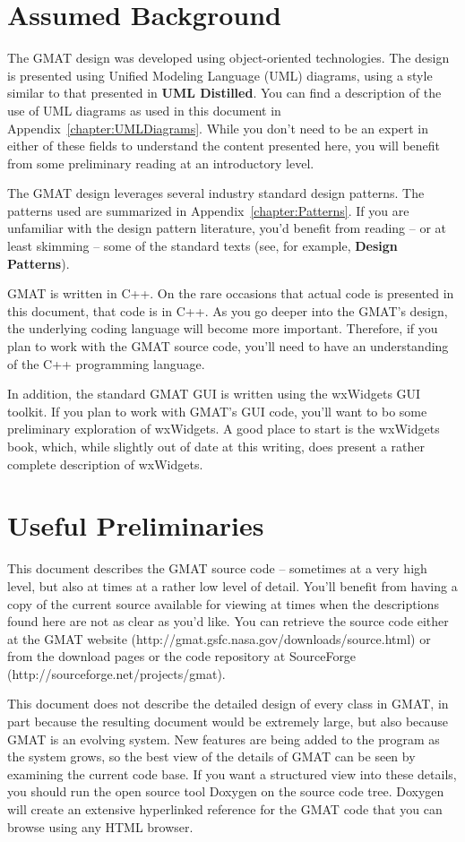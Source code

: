\section*{Assumed Background}

The GMAT design was developed using object-oriented technologies.  The design is presented using
Unified Modeling Language (UML) diagrams, using a style similar to that presented in \textbf{UML
Distilled}\cite{fowler}.  You can find a description of the use of UML diagrams as used in this
document in Appendix~\ref{chapter:UMLDiagrams}.  While you don't need to be an expert in either of
these fields to understand the content presented here, you will benefit from some preliminary
reading at an introductory level.

The GMAT design leverages several industry standard design patterns.  The patterns used are
summarized in Appendix~\ref{chapter:Patterns}.  If you are unfamiliar with the design pattern
literature, you'd benefit from reading -- or at least skimming -- some of the standard texts (see,
for example, \textbf{Design Patterns}\cite{GoF}).

GMAT is written in C++.  On the rare occasions that actual code is presented in this document, that
code is in C++.  As you go deeper into the GMAT's design, the underlying coding language will
become more important.  Therefore, if you plan to work with the GMAT source code, you'll need to
have an understanding of the C++ programming language.

In addition, the standard GMAT GUI is written using the wxWidgets\cite{wxWidgets} GUI toolkit.  If
you plan to work with GMAT's GUI code, you'll want to bo some preliminary exploration of wxWidgets.
 A good place to start is the wxWidgets book\cite{wxBook}, which, while slightly out of date at
this writing, does present a rather complete description of wxWidgets.

\section*{Useful Preliminaries}

This document describes the GMAT source code -- sometimes at a very high level, but also at times at
a rather low level of detail.  You'll benefit from having a copy of the current source available
for viewing at times when the descriptions found here are not as clear as you'd like.  You can
retrieve the source code either at the GMAT website
(http://gmat.gsfc.nasa.gov/downloads/source.html) or from the download pages or the code repository
at SourceForge (http://sourceforge.net/projects/gmat).

This document does not describe the detailed design of every class in GMAT, in part because the
resulting document would be extremely large, but also because GMAT is an evolving system.  New
features are being added to the program as the system grows, so the best view of the details of GMAT
can be seen by examining the current code base.  If you want a structured view into these details,
you should run the open source tool Doxygen\cite{doxygen} on the source code tree. Doxygen will
create an extensive hyperlinked reference for the GMAT code that you can browse using any HTML
browser.


